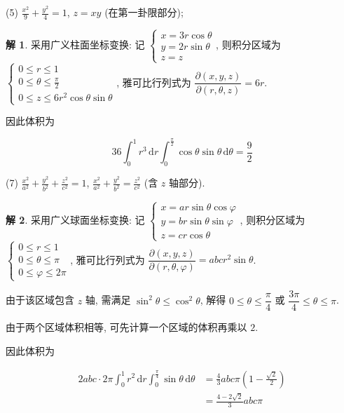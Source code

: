 \documentclass[a4paper,12pt]{article}
\theoremstyle{definition}
\newtheorem*{sol}{解}
\begin{document}
(5) $\frac{x^2}{9} + \frac{y^2}{4} = 1$, $z=xy$ (在第一卦限部分);
\begin{sol}
    采用广义柱面坐标变换: 记 $\begin{cases}
            x=3r\cos\theta \\
            y=2r\sin\theta \\
            z=z
        \end{cases}$, 则积分区域为 $\begin{cases}
            0\leq r\leq 1                  \\
            0\leq \theta\leq \frac{\pi}{2} \\
            0\leq z\leq 6r^2\cos\theta\sin\theta
        \end{cases}$, 雅可比行列式为 $\dfrac{\partial(x,y,z)}{\partial(r,\theta,z)}=6r$.

    因此体积为

    $$36\int_0^1 r^3\,\mathrm{d}r\int_0^{\frac{\pi}{2}}\cos\theta\sin\theta\,\mathrm{d}\theta=\frac{9}{2}$$
\end{sol}
(7) $\frac{x^2}{a^2} + \frac{y^2}{b^2} + \frac{z^2}{c^2} = 1$, $\frac{x^2}{a^2} + \frac{y^2}{b^2} = \frac{z^2}{c^2}$ (含 $z$ 轴部分).
\begin{sol}
    采用广义球面坐标变换: 记 $\begin{cases}
            x=ar\sin\theta\cos\varphi \\
            y=br\sin\theta\sin\varphi \\
            z=cr\cos\theta
        \end{cases}$, 则积分区域为 $\begin{cases}
            0\leq r\leq 1        \\
            0\leq \theta\leq \pi \\
            0\leq \varphi\leq 2\pi
        \end{cases}$, 雅可比行列式为 $\dfrac{\partial(x,y,z)}{\partial(r,\theta,\varphi)}=abcr^2\sin\theta$.

    由于该区域包含 $z$ 轴, 需满足 $\sin^2\theta\leq\cos^2\theta$, 解得 $0\leq\theta\leq\dfrac{\pi}{4}$ 或 $\dfrac{3\pi}{4}\leq\theta\leq\pi$.

    由于两个区域体积相等, 可先计算一个区域的体积再乘以 $2$.

    因此体积为

    \begin{align*}
        2abc\cdot2\pi\int_0^1 r^2\,\mathrm{d}r\int_0^{\frac{\pi}{4}}\sin\theta\,\mathrm{d}\theta
         & =\frac{4}{3}abc\pi\left(1-\frac{\sqrt{2}}{2}\right) \\
         & =\frac{4-2\sqrt{2}}{3}abc\pi
    \end{align*}
\end{sol}
\end{document}
